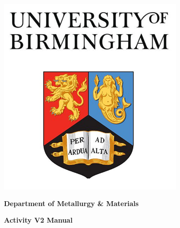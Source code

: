 \documentclass[12pt,twoside]{manual}
\begin{document}






\begin{titlepage}
  \begin{center}
    \centerline{\includegraphics[width=0.7\textwidth]{images/Cover_Art}}


    \textbf{Department of Metallurgy \& Materials}

    \vspace*{2.0cm}
    \Large{}
    \textbf{Activity V2 Manual}
    \vspace{0.8cm}
    \normalsize{}

  \end{center}
\end{titlepage}



\tableofcontents





\end{document}
